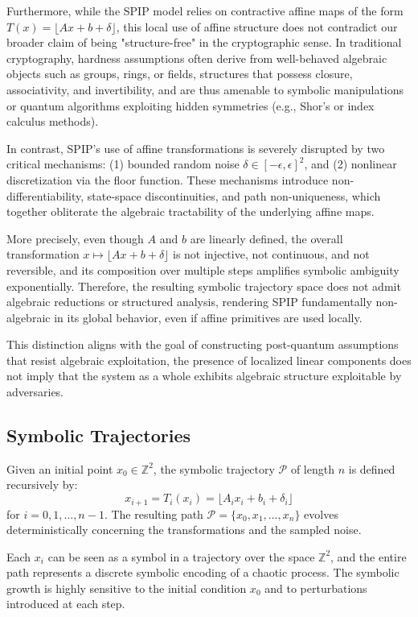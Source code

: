\documentclass[twocolumn,10pt]{article}
\begin{document}
Furthermore, while the SPIP model relies on contractive affine maps of the form $T(x) = \lfloor A x + b + \delta \rfloor$, this local use of affine structure does not contradict our broader claim of being "structure-free" in the cryptographic sense. In traditional cryptography, hardness assumptions often derive from well-behaved algebraic objects such as groups, rings, or fields, structures that possess closure, associativity, and invertibility, and are thus amenable to symbolic manipulations or quantum algorithms exploiting hidden symmetries (e.g., Shor's or index calculus methods).

In contrast, SPIP's use of affine transformations is severely disrupted by two critical mechanisms: (1) bounded random noise $\delta \in [-\epsilon, \epsilon]^2$, and (2) nonlinear discretization via the floor function. These mechanisms introduce non-differentiability, state-space discontinuities, and path non-uniqueness, which together obliterate the algebraic tractability of the underlying affine maps.

More precisely, even though $A$ and $b$ are linearly defined, the overall transformation $x \mapsto \lfloor A x + b + \delta \rfloor$ is not injective, not continuous, and not reversible, and its composition over multiple steps amplifies symbolic ambiguity exponentially. Therefore, the resulting symbolic trajectory space does not admit algebraic reductions or structured analysis, rendering SPIP fundamentally non-algebraic in its global behavior, even if affine primitives are used locally.

This distinction aligns with the goal of constructing post-quantum assumptions that resist algebraic exploitation, the presence of localized linear components does not imply that the system as a whole exhibits algebraic structure exploitable by adversaries.

\subsection{Symbolic Trajectories}
Given an initial point $x_0 \in \mathbb{Z}^2$, the symbolic trajectory $\mathcal{P}$ of length $n$ is defined recursively by:
\[
x_{i+1} = T_i(x_i) = \lfloor A_i x_i + b_i + \delta_i \rfloor
\]
for $i = 0, 1, \dots, n-1$. The resulting path $\mathcal{P} = \{x_0, x_1, ..., x_n\}$ evolves deterministically concerning the transformations and the sampled noise.

Each $x_i$ can be seen as a symbol in a trajectory over the space $\mathbb{Z}^2$, and the entire path represents a discrete symbolic encoding of a chaotic process. The symbolic growth is highly sensitive to the initial condition $x_0$ and to perturbations introduced at each step.
\end{document}
